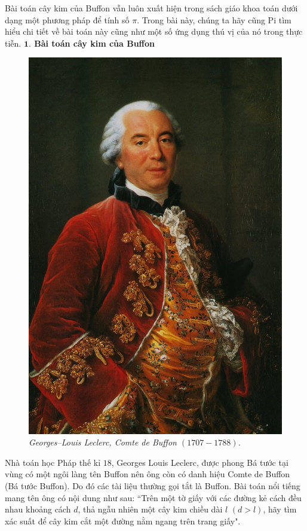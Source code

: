 \begin{multicols}{2}
	Bài toán cây kim của Buffon vẫn luôn xuất hiện trong sách giáo khoa toán dưới dạng một phương pháp để tính số $\pi$. Trong bài này, chúng ta hãy cũng Pi tìm hiểu chi tiết về bài toán này cũng như một số ứng dụng thú vị của nó trong thực tiễn.
	\vskip 0.1cm
	\textbf{\color{toanhocdoisong}$\pmb{1.}$ Bài toán cây kim của Buffon}
	\begin{figure}[H]
		\vspace*{-5pt}
		\centering
		\captionsetup{labelformat= empty, justification=centering}
		\includegraphics[width=0.6\linewidth]{1}
		\caption{\small\textit{\color{toanhocdoisong}Georges--Louis Leclerc, Comte de Buffon $(1707-1788)$.}}
		\vspace*{-10pt}
	\end{figure}
	Nhà toán học Pháp thế kỉ $18$, Georges Louis Leclerc, được phong Bá tước tại vùng có một ngôi làng tên Buffon nên ông còn có danh hiệu Comte de Buffon (Bá tước Buffon). Do đó các tài liệu thường gọi tắt là Buffon. Bài toán nổi tiếng mang tên ông có nội dung như sau:
	\vskip 0.1cm
	``Trên một tờ giấy với các đường kẻ cách đều nhau khoảng cách $d$, thả ngẫu nhiên một cây kim chiều dài $l$ $(d>l)$, hãy tìm xác suất để cây kim cắt một đường nằm ngang trên trang giấy".
	\begin{figure}[H]
		\vspace*{-5pt}
		\centering
		\captionsetup{labelformat= empty, justification=centering}

\end{figure}
\end{multicols}
